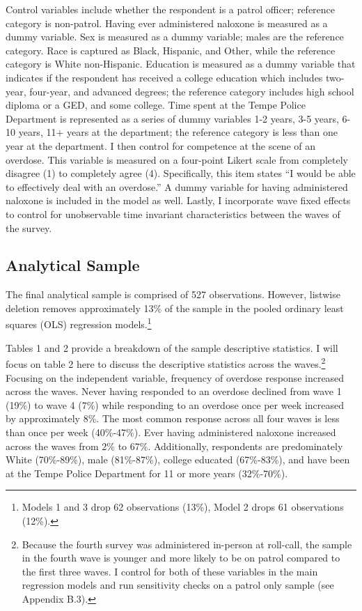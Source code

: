 Control variables include whether the respondent is a patrol officer; reference category is non-patrol. Having ever administered naloxone is measured as a dummy variable. Sex is measured as a dummy variable; males are the reference category. Race is captured as Black, Hispanic, and Other, while the reference category is White non-Hispanic. Education is measured as a dummy variable that indicates if the respondent has received a college education which includes two-year, four-year, and advanced degrees; the reference category includes high school diploma or a GED, and some college. Time spent at the Tempe Police Department is represented as a series of dummy variables 1-2 years, 3-5 years, 6-10 years, 11+ years at the department; the reference category is less than one year at the department. I then control for competence at the scene of an overdose. This variable is measured on a four-point Likert scale from completely disagree (1) to completely agree (4). Specifically, this item states “I would be able to effectively deal with an overdose.” A dummy variable for having administered naloxone is included in the model as well. Lastly, I incorporate wave fixed effects to control for unobservable time invariant characteristics between the waves of the survey.

\subsection{Analytical Sample}

The final analytical sample is comprised of 527 observations. However, listwise deletion removes approximately 13\% of the sample in the pooled ordinary least squares (OLS) regression models.\footnote{Models 1 and 3 drop 62 observations (13\%), Model 2 drops 61 observations (12\%).} 

Tables 1 and 2 provide a breakdown of the sample descriptive statistics. I will focus on table 2 here to discuss the descriptive statistics across the waves.\footnote{Because the fourth survey was administered in-person at roll-call, the sample in the fourth wave is younger and more likely to be on patrol compared to the first three waves. I control for both of these variables in the main regression models and run sensitivity checks on a patrol only sample (see Appendix B.3).} Focusing on the independent variable, frequency of overdose response increased across the waves. Never having responded to an overdose declined from wave 1 (19\%) to wave 4 (7\%) while responding to an overdose once per week increased by approximately 8\%. The most common response across all four waves is less than once per week (40\%-47\%). Ever having administered naloxone increased across the waves from 2\% to 67\%. Additionally, respondents are predominately White (70\%-89\%), male (81\%-87\%), college educated (67\%-83\%), and have been at the Tempe Police Department for 11 or more years (32\%-70\%).

